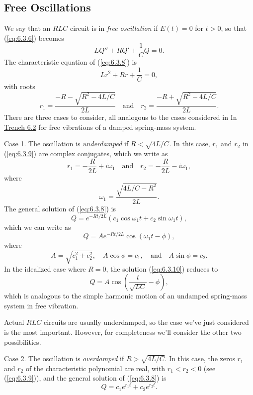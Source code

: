 \documentclass{ximera}
\begin{document}
\subsection*{Free Oscillations}

We say that an $RLC$ circuit is in \textit{free oscillation} if $E(t)=0$
for $t>0$, so that (\ref{eq:6.3.6}) becomes
\begin{equation} \label{eq:6.3.8}
LQ''+RQ'+\frac{1}{C}Q=0.
\end{equation}
The characteristic equation of (\ref{eq:6.3.8}) is
$$
Lr^2+Rr+\frac{1}{C}=0,
$$
with roots
\begin{equation}\label{eq:6.3.9}
r_1=\frac{-R-\sqrt{R^2-4L/C}}{2L}\quad\mbox{and}\quad r_2=
\frac{-R+\sqrt{R^2-4L/C}}{2L}.
\end{equation}
There are three cases to consider, all analogous to the cases
considered in In \href{https://ximera.osu.edu/ode/main/springProblemsII/springProblemsII}{Trench 6.2} for free vibrations of a damped
spring-mass system.

Case 1.
The oscillation is \textit{underdamped} if $R<\sqrt{4L/C}$. In this
case, $r_1$ and $r_2$ in (\ref{eq:6.3.9}) are complex conjugates, which we
write as
$$
r_1=-\frac{R}{2L}+i\omega_1\quad\mbox{and}\quad r_2=-\frac{R}{2L}-i\omega_1,
$$
where
$$
\omega_1=\frac{\sqrt{4L/C-R^2}}{2L}.
$$
The general solution of  (\ref{eq:6.3.8})  is
$$
Q=e^{-Rt/2L}(c_1\cos\omega_1 t+c_2\sin\omega_1 t),
$$
which we can write as
\begin{equation}\label{eq:6.3.10}
Q=Ae^{-Rt/2L}\cos(\omega_1 t-\phi),
\end{equation}
 where
$$
A=\sqrt{c_1^2+c_2^2},\quad A\cos\phi=c_1,\quad\mbox{and}\quad A\sin\phi=c_2.
$$
In the idealized case where $R=0$, the solution (\ref{eq:6.3.10})
reduces to
$$
Q=A\cos\left(\frac{t}{\sqrt{LC}}-\phi\right),
$$
which is analogous to  the simple harmonic motion of an undamped
spring-mass system in free vibration.

Actual $RLC$ circuits are usually underdamped, so the case we've just
considered is the most important. However, for completeness we'll
consider the other two possibilities.

Case 2.
The oscillation is \textit{overdamped} if $R>\sqrt{4L/C}$. In this case,
the zeros $r_1$ and $r_2$ of the characteristic polynomial are real,
with $r_1<r_2<0$ (see (\ref{eq:6.3.9})), and the general solution of
(\ref{eq:6.3.8}) is
\begin{equation}\label{eq:6.3.11}
Q=c_1e^{r_1t}+c_2e^{r_2t}.
\end{equation}
\end{document}

